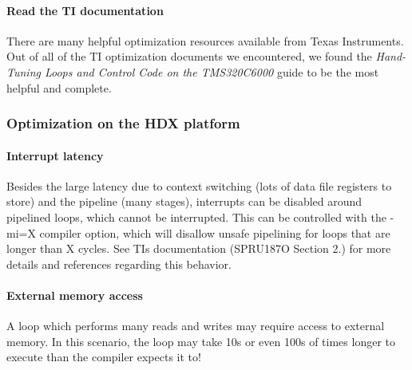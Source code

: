 \hypertarget{a00832_subsubsection__read_the_ti_documentation_}{}\paragraph{Read the T\+I documentation}\label{a00832_subsubsection__read_the_ti_documentation_}
 There are many helpful optimization resources available from Texas Instruments. Out of all of the TI optimization documents we encountered, we found the {\itshape Hand-\/\+Tuning Loops and Control Code on the T\+M\+S320\+C6000} guide to be the most helpful and complete.

\hypertarget{a00832_subsection__optimization_on_the_hdx_platform}{}\subsubsection{Optimization on the H\+D\+X platform}\label{a00832_subsection__optimization_on_the_hdx_platform}
 \hypertarget{a00832_subsubsection__interrupt_latency_}{}\paragraph{Interrupt latency}\label{a00832_subsubsection__interrupt_latency_}
 Besides the large latency due to context switching (lots of data file registers to store) and the pipeline (many stages), interrupts can be disabled around pipelined loops, which cannot be interrupted. This can be controlled with the -\/mi=X compiler option, which will disallow unsafe pipelining for loops that are longer than X cycles. See TI\textquotesingle{}s documentation (S\+P\+R\+U187O Section 2.) for more details and references regarding this behavior.

\hypertarget{a00832_subsubsection__external_memory_access_}{}\paragraph{External memory access}\label{a00832_subsubsection__external_memory_access_}
 A loop which performs many reads and writes may require access to external memory. In this scenario, the loop may take 10\textquotesingle{}s or even 100\textquotesingle{}s of times longer to execute than the compiler expects it to!

